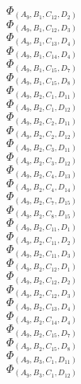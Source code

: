 \documentclass[14pt]{article}
\begin{document}
    $\Phi_{({A}_{9}, {B}_{1}, {C}_{12}, {D}_{2})}$ \\ 
    $\Phi_{({A}_{9}, {B}_{1}, {C}_{12}, {D}_{3})}$ \\ 
    $\Phi_{({A}_{9}, {B}_{1}, {C}_{13}, {D}_{4})}$ \\ 
    $\Phi_{({A}_{9}, {B}_{1}, {C}_{14}, {D}_{4})}$ \\ 
    $\Phi_{({A}_{9}, {B}_{1}, {C}_{15}, {D}_{7})}$ \\ 
    $\Phi_{({A}_{9}, {B}_{1}, {C}_{15}, {D}_{8})}$ \\ 
    $\Phi_{({A}_{9}, {B}_{2}, {C}_{1}, {D}_{11})}$ \\ 
    $\Phi_{({A}_{9}, {B}_{2}, {C}_{1}, {D}_{12})}$ \\ 
    $\Phi_{({A}_{9}, {B}_{2}, {C}_{2}, {D}_{11})}$ \\ 
    $\Phi_{({A}_{9}, {B}_{2}, {C}_{2}, {D}_{12})}$ \\ 
    $\Phi_{({A}_{9}, {B}_{2}, {C}_{3}, {D}_{11})}$ \\ 
    $\Phi_{({A}_{9}, {B}_{2}, {C}_{3}, {D}_{12})}$ \\ 
    $\Phi_{({A}_{9}, {B}_{2}, {C}_{4}, {D}_{13})}$ \\ 
    $\Phi_{({A}_{9}, {B}_{2}, {C}_{4}, {D}_{14})}$ \\ 
    $\Phi_{({A}_{9}, {B}_{2}, {C}_{7}, {D}_{15})}$ \\ 
    $\Phi_{({A}_{9}, {B}_{2}, {C}_{8}, {D}_{15})}$ \\ 
    $\Phi_{({A}_{9}, {B}_{2}, {C}_{11}, {D}_{1})}$ \\ 
    $\Phi_{({A}_{9}, {B}_{2}, {C}_{11}, {D}_{2})}$ \\ 
    $\Phi_{({A}_{9}, {B}_{2}, {C}_{11}, {D}_{3})}$ \\ 
    $\Phi_{({A}_{9}, {B}_{2}, {C}_{12}, {D}_{1})}$ \\ 
    $\Phi_{({A}_{9}, {B}_{2}, {C}_{12}, {D}_{2})}$ \\ 
    $\Phi_{({A}_{9}, {B}_{2}, {C}_{12}, {D}_{3})}$ \\ 
    $\Phi_{({A}_{9}, {B}_{2}, {C}_{13}, {D}_{4})}$ \\ 
    $\Phi_{({A}_{9}, {B}_{2}, {C}_{14}, {D}_{4})}$ \\ 
    $\Phi_{({A}_{9}, {B}_{2}, {C}_{15}, {D}_{7})}$ \\ 
    $\Phi_{({A}_{9}, {B}_{2}, {C}_{15}, {D}_{8})}$ \\ 
    $\Phi_{({A}_{9}, {B}_{3}, {C}_{1}, {D}_{11})}$ \\ 
    $\Phi_{({A}_{9}, {B}_{3}, {C}_{1}, {D}_{12})}$ \\ 
\end{document}
